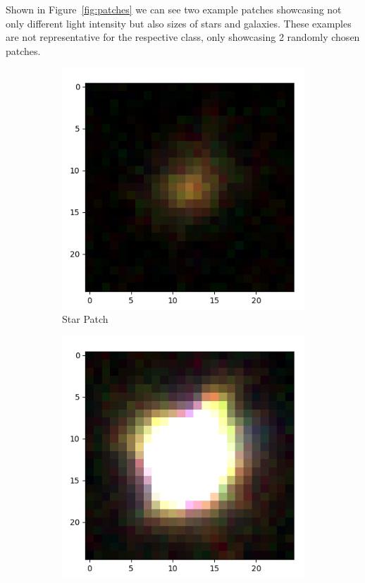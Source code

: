 \documentclass[
a4paper,     %
10pt         %
]{scrartcl}  %
\begin{document}
Shown in Figure~\ref{fig:patches} we can see two example patches showcasing not only different light intensity but also sizes of stars and galaxies.
These examples are not representative for the respective class, only showcasing 2 randomly chosen patches.
\begin{figure}[H]
    \centering
    \begin{subfigure}{.49\textwidth}
        \centering
        \includegraphics[width=\linewidth]{figures/star_patch}
        \caption{Star Patch}
    \end{subfigure}
    \begin{subfigure}{.49\textwidth}
        \centering
        \includegraphics[width=\linewidth]{figures/gal_patch}

\end{subfigure}
\end{figure}
\end{document}
